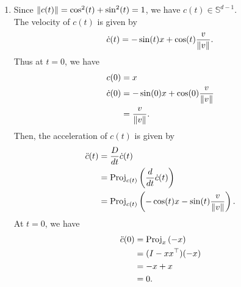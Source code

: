 \documentclass[en, oneside]{assignment}
\begin{document}
 \begin{sol}
    \begin{enumerate}[label=(\arabic*)]
        \item Since $\left\lVert c(t)\right\rVert = \cos^2(t) + \sin^2(t) = 1$, we have $c(t) \in \mathbb{S}^{d-1}$.\\
        The velocity of $c(t)$ is given by
        \begin{equation*}
            \dot{c}(t) = -\sin(t) x + \cos(t) \frac{v}{\left\lVert v\right\rVert}.
        \end{equation*}
        Thus at $t = 0$, we have
        \begin{align*}
            c(0) &= x\\
            \dot{c}(0) &= -\sin(0) x + \cos(0) \frac{v}{\left\lVert v\right\rVert}\\
            &= \frac{v}{\left\lVert v\right\rVert}.
        \end{align*}
        Then, the acceleration of $c(t)$ is given by
        \begin{align*}
            \ddot{c}(t) &= \frac{D}{dt} \dot{c}(t)\\
            &= \operatorname{Proj}_{c(t)} \left(\frac{d}{dt} \dot{c}(t)\right)\\
            &= \operatorname{Proj}_{c(t)} \left(-\cos(t) x - \sin(t) \frac{v}{\left\lVert v\right\rVert}\right).
        \end{align*}
        At $t = 0$, we have
        \begin{align*}
            \ddot{c}(0) &= \operatorname{Proj}_x \left(-x\right)\\
            &= (I - x x^\top) (-x)\\
            &= -x + x\\
            &= 0.
        \end{align*}
    \end{enumerate}
 \end{sol}
\end{document}

